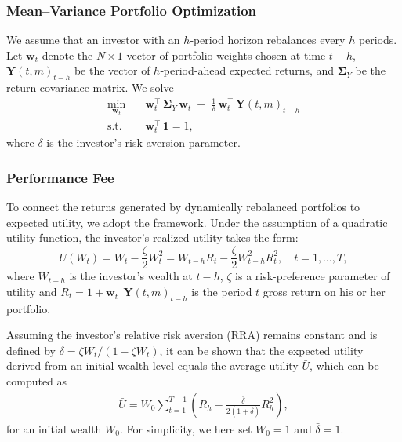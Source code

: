 \documentclass[
  12pt]{article}
\begin{document}
\subsubsection{Mean--Variance Portfolio Optimization}

We assume that an investor with an $h$‐period horizon rebalances every $h$ periods. Let $\boldsymbol{w}_t$ denote the $N\times1$ vector of portfolio weights chosen at time $t-h$, $\boldsymbol{Y}(t,m)_{t-h}$ be the vector of $h$‐period‐ahead expected returns, and $\boldsymbol{\Sigma}_Y$ be the return covariance matrix. We solve
\begin{equation}
\begin{aligned}
\min_{\boldsymbol{w}_t}\quad & \boldsymbol{w}_t^\top \,\boldsymbol{\Sigma}_Y\, \boldsymbol{w}_t \;-\;\frac{1}{\delta}\,\boldsymbol{w}_t^\top \,\boldsymbol{Y}(t,m)_{t-h}\\
\text{s.t.}\quad & \boldsymbol{w}_t^\top \,\boldsymbol{1}=1,
\end{aligned}
\end{equation}
where $\delta$ is the investor’s risk‐aversion parameter.

\subsubsection{Performance Fee}
To connect the returns generated by dynamically rebalanced portfolios to expected utility, we adopt the \cite{west1993utility} framework. Under the assumption of a quadratic utility function, the investor’s realized utility takes the form:
\begin{equation}
    U(W_{t}) = W_{t} - \frac{\zeta}{2} W_{t}^2 = W_{t-h}R_{t} -  \frac{\zeta}{2}W_{t-h}^2R_{t}^2, \quad t=1,\ldots,T,
\end{equation}
where $W_{t-h}$ is the investor’s wealth at $t-h$, $\zeta$ is a risk-preference parameter of utility and $R_{t} = 1 + \boldsymbol{w}_t^\top \,\boldsymbol{Y}(t,m)_{t-h}$ is the period $t$ gross return on his or her portfolio.

Assuming the investor's relative risk aversion (RRA) remains constant and is defined by $\bar{\delta} = \zeta W_t / (1- \zeta W_t)$, it can be shown that the expected utility derived from an initial wealth level equals the average utility $\bar{U}$, which can be computed as
\begin{align}
    \bar{U} = W_0\sum_{t=1}^{T-1} \left(R_{h} - \frac{\bar{\delta}}{2(1+\bar{\delta})}R_{h}^{2} \right),
    \label{wealth}
\end{align} for an initial wealth $W_0$. For simplicity, we here set $W_0 = 1$ and $\bar{\delta} = 1$.
\end{document}
